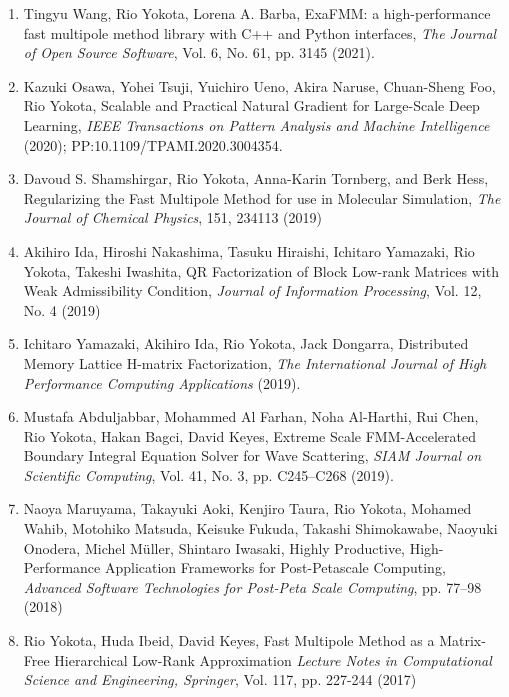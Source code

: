 \documentclass[margin,line]{cv}
\begin{document}
\begin{resume}
\begin{enumerate}
\item Tingyu Wang, Rio Yokota, Lorena A. Barba, ExaFMM: a high-performance fast multipole method library with C++ and Python interfaces, {\it The Journal of Open Source Software}, Vol. 6, No. 61, pp. 3145 (2021).

\item Kazuki Osawa, Yohei Tsuji, Yuichiro Ueno, Akira Naruse, Chuan-Sheng Foo, Rio Yokota, Scalable and Practical Natural Gradient for Large-Scale Deep Learning, {\it IEEE Transactions on Pattern Analysis and Machine Intelligence} (2020); PP:10.1109/TPAMI.2020.3004354.

\item Davoud S. Shamshirgar, Rio Yokota, Anna-Karin Tornberg, and Berk Hess, Regularizing the Fast Multipole Method for use in Molecular Simulation, {\it The Journal of Chemical Physics}, 151, 234113 (2019)

\item Akihiro Ida, Hiroshi Nakashima, Tasuku Hiraishi, Ichitaro Yamazaki, Rio Yokota, Takeshi Iwashita, QR Factorization of Block Low-rank Matrices with Weak Admissibility Condition, {\it Journal of Information Processing}, Vol. 12, No. 4 (2019)

\item Ichitaro Yamazaki, Akihiro Ida, Rio Yokota, Jack Dongarra, Distributed Memory Lattice H-matrix Factorization, {\it The International Journal of High Performance Computing Applications} (2019).

\item Mustafa Abduljabbar, Mohammed Al Farhan, Noha Al-Harthi, Rui Chen, Rio Yokota, Hakan Bagci, David Keyes, Extreme Scale FMM-Accelerated Boundary Integral Equation Solver for Wave Scattering, {\it SIAM Journal on Scientific Computing}, Vol. 41, No. 3, pp. C245--C268 (2019).

\item Naoya Maruyama, Takayuki Aoki, Kenjiro Taura, Rio Yokota, Mohamed Wahib, Motohiko Matsuda, Keisuke Fukuda, Takashi Shimokawabe, Naoyuki Onodera, Michel M\"uller, Shintaro Iwasaki, Highly Productive, High-Performance Application Frameworks for Post-Petascale Computing, {\it Advanced Software Technologies for Post-Peta Scale Computing}, pp. 77--98 (2018)

\item Rio Yokota, Huda Ibeid, David Keyes, Fast Multipole Method as a Matrix-Free Hierarchical Low-Rank Approximation {\it Lecture Notes in Computational Science and Engineering, Springer}, Vol. 117, pp. 227-244 (2017)


\end{enumerate}
\end{resume}
\end{document}
